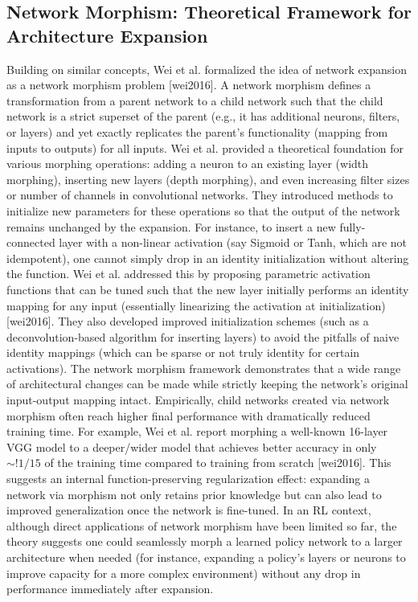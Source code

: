 \subsection{Network Morphism: Theoretical Framework for Architecture Expansion}
Building on similar concepts, Wei et al. formalized the idea of network expansion as a network morphism problem [wei2016]. A network morphism defines a transformation from a parent network to a child network such that the child network is a strict superset of the parent (e.g., it has additional neurons, filters, or layers) and yet exactly replicates the parent’s functionality (mapping from inputs to outputs) for all inputs. Wei et al. provided a theoretical foundation for various morphing operations: adding a neuron to an existing layer (width morphing), inserting new layers (depth morphing), and even increasing filter sizes or number of channels in convolutional networks. They introduced methods to initialize new parameters for these operations so that the output of the network remains unchanged by the expansion. For instance, to insert a new fully-connected layer with a non-linear activation (say Sigmoid or Tanh, which are not idempotent), one cannot simply drop in an identity initialization without altering the function. Wei et al. addressed this by proposing parametric activation functions that can be tuned such that the new layer initially performs an identity mapping for any input (essentially linearizing the activation at initialization) [wei2016]. They also developed improved initialization schemes (such as a deconvolution-based algorithm for inserting layers) to avoid the pitfalls of naive identity mappings (which can be sparse or not truly identity for certain activations). The network morphism framework demonstrates that a wide range of architectural changes can be made while strictly keeping the network’s original input-output mapping intact. Empirically, child networks created via network morphism often reach higher final performance with dramatically reduced training time. For example, Wei et al. report morphing a well-known 16-layer VGG model to a deeper/wider model that achieves better accuracy in only $\sim!1/15$ of the training time compared to training from scratch [wei2016]. This suggests an internal function-preserving regularization effect: expanding a network via morphism not only retains prior knowledge but can also lead to improved generalization once the network is fine-tuned. In an RL context, although direct applications of network morphism have been limited so far, the theory suggests one could seamlessly morph a learned policy network to a larger architecture when needed (for instance, expanding a policy’s layers or neurons to improve capacity for a more complex environment) without any drop in performance immediately after expansion.

